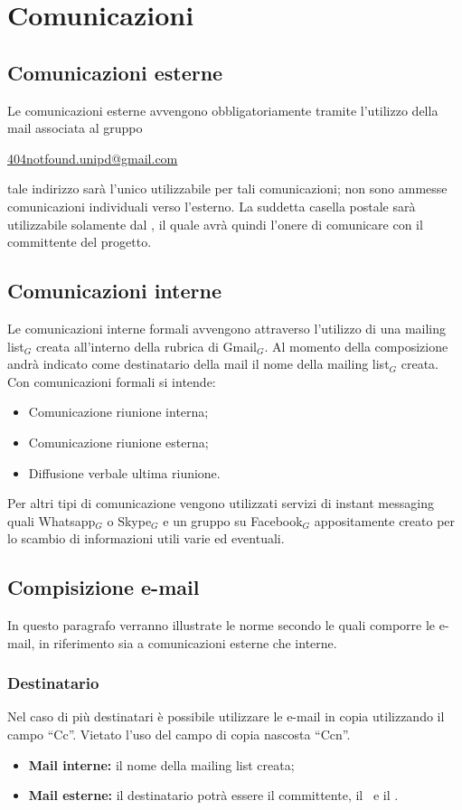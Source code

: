 \section{Comunicazioni}
\subsection{Comunicazioni esterne}
Le comunicazioni esterne avvengono obbligatoriamente tramite l’utilizzo della mail associata al gruppo
\begin{center} \href{mailto:404notfound.unipd@gmail.com}{404notfound.unipd@gmail.com}
\end{center}
tale indirizzo sarà l’unico utilizzabile per tali comunicazioni; non sono ammesse comunicazioni individuali verso l’esterno.
La suddetta casella postale sarà utilizzabile solamente dal \ruoloResponsabile, il quale avrà quindi l’onere di comunicare con il committente del progetto.

\subsection{Comunicazioni interne}
Le comunicazioni interne formali avvengono attraverso l’utilizzo di una mailing list$_G$ creata all'interno della rubrica di Gmail$_G$. Al momento della composizione andrà indicato come destinatario della mail il nome della mailing list$_G$ creata.
Con comunicazioni formali si intende:
\begin{itemize}
	\item Comunicazione riunione interna;
	\item Comunicazione riunione esterna;
	\item Diffusione verbale ultima riunione.
\end{itemize}

Per altri tipi di comunicazione vengono utilizzati servizi di instant messaging quali Whatsapp$_G$ o Skype$_G$ e un gruppo su Facebook$_G$ appositamente creato per lo scambio di informazioni utili varie ed eventuali.

\subsection{Compisizione e-mail}
In questo paragrafo verranno illustrate le norme secondo le quali comporre le e-mail, in riferimento sia a comunicazioni esterne che interne.

\subsubsection{Destinatario}
Nel caso di più destinatari è possibile utilizzare le e-mail in copia utilizzando il campo ``Cc''. Vietato l'uso del campo di copia nascosta ``Ccn''.
\begin{itemize}
	\item \textbf{Mail interne:} il nome della mailing list creata;
	\item \textbf{Mail esterne:} il destinatario potrà essere il committente, il \Vardanega\ e il \Cardin.
\end{itemize}

